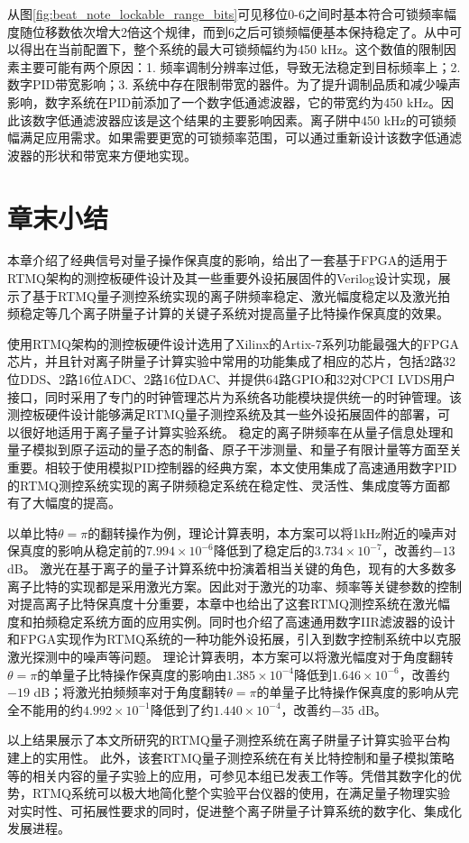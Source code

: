 从图\ref{fig:beat_note_lockable_range_bits}可见移位0-6之间时基本符合可锁频率幅度随位移数依次增大2倍这个规律，而到6之后可锁频幅便基本保持稳定了。从中可以得出在当前配置下，整个系统的最大可锁频幅约为450 kHz。这个数值的限制因素主要可能有两个原因：1. 频率调制分辨率过低，导致无法稳定到目标频率上；2. 数字PID带宽影响；3. 系统中存在限制带宽的器件。为了提升调制品质和减少噪声影响，数字系统在PID前添加了一个数字低通滤波器，它的带宽约为450 kHz。因此该数字低通滤波器应该是这个结果的主要影响因素。离子阱中450 kHz的可锁频幅满足应用需求。如果需要更宽的可锁频率范围，可以通过重新设计该数字低通滤波器的形状和带宽来方便地实现。








\newpage
\section[章末小结]{章末小结}

本章介绍了经典信号对量子操作保真度的影响，给出了一套基于FPGA的适用于RTMQ架构的测控板硬件设计及其一些重要外设拓展固件的Verilog设计实现，展示了基于RTMQ量子测控系统实现的离子阱频率稳定、激光幅度稳定以及激光拍频稳定等几个离子阱量子计算的关键子系统对提高量子比特操作保真度的效果。

使用RTMQ架构的测控板硬件设计选用了Xilinx的Artix-7系列功能最强大的FPGA芯片，并且针对离子阱量子计算实验中常用的功能集成了相应的芯片，包括2路32位DDS、2路16位ADC、2路16位DAC、并提供64路GPIO和32对CPCI LVDS用户接口，同时采用了专门的时钟管理芯片为系统各功能模块提供统一的时钟管理。该测控板硬件设计能够满足RTMQ量子测控系统及其一些外设拓展固件的部署，可以很好地适用于离子量子计算实验系统。
稳定的离子阱频率在从量子信息处理和量子模拟到原子运动的量子态的制备、原子干涉测量、和量子有限计量等方面至关重要。相较于使用模拟PID控制器的经典方案，本文使用集成了高速通用数字PID的RTMQ测控系统实现的离子阱频稳定系统在稳定性、灵活性、集成度等方面都有了大幅度的提高。

以单比特$\theta=\pi$的翻转操作为例，理论计算表明，本方案可以将1kHz附近的噪声对保真度的影响从稳定前的$7.994\times10^{-6}$降低到了稳定后的$3.734\times10^{-7}$，改善约$-13$ dB。
激光在基于离子的量子计算系统中扮演着相当关键的角色，现有的大多数多离子比特的实现都是采用激光方案。因此对于激光的功率、频率等关键参数的控制对提高离子比特保真度十分重要，本章中也给出了这套RTMQ测控系统在激光幅度和拍频稳定系统方面的应用实例。同时也介绍了高速通用数字IIR滤波器的设计和FPGA实现作为RTMQ系统的一种功能外设拓展，引入到数字控制系统中以克服激光探测中的噪声等问题。
理论计算表明，本方案可以将激光幅度对于角度翻转$\theta=\pi$的单量子比特操作保真度的影响由$1.385\times 10^{-4}$降低到$1.646\times 10^{-6}$，改善约$-19$ dB；将激光拍频频率对于角度翻转$\theta=\pi$的单量子比特操作保真度的影响从完全不能用的约$4.992\times 10^{-1}$降低到了约$1.440\times 10^{-4}$，改善约$-35$ dB。


以上结果展示了本文所研究的RTMQ量子测控系统在离子阱量子计算实验平台构建上的实用性。
此外，该套RTMQ量子测控系统在有关比特控制和量子模拟策略等的相关内容的量子实验上的应用，可参见本组已发表工作\cite[]{Zhang_Wang_Wang_Zhang_Wu_Jie_Lu_2022}等。凭借其数字化的优势，RTMQ系统可以极大地简化整个实验平台仪器的使用，在满足量子物理实验对实时性、可拓展性要求的同时，促进整个离子阱量子计算系统的数字化、集成化发展进程。





